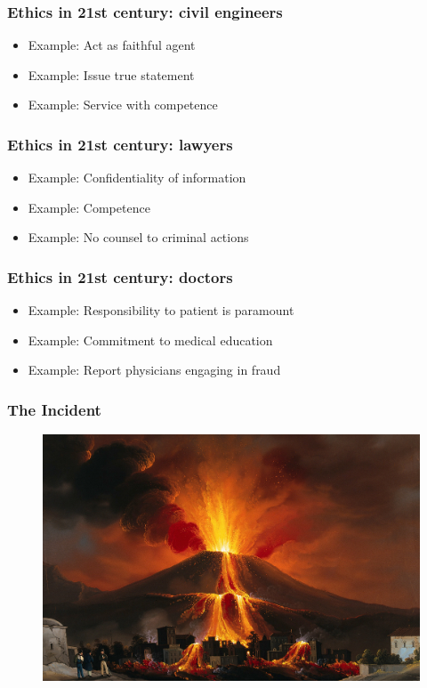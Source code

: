 \begin{frame}[fragile]
\frametitle{Ethics in 21st century: civil engineers}

\begin{itemize}
\item Example: Act as faithful agent\pause
\item Example: Issue true statement\pause
\item Example: Service with competence
\end{itemize}

\end{frame}

\begin{frame}[fragile]
\frametitle{Ethics in 21st century: lawyers}

\begin{itemize}
\item Example: Confidentiality of information\pause
\item Example: Competence\pause
\item Example: No counsel to criminal actions
\end{itemize}

\end{frame}

\begin{frame}[fragile]
\frametitle{Ethics in 21st century: doctors}

\begin{itemize}
\item Example: Responsibility to patient is paramount\pause
\item Example: Commitment to medical education\pause
\item Example: Report physicians engaging in fraud
\end{itemize}

\end{frame}

\begin{frame}[fragile]
\frametitle{The Incident}

\begin{figure}
\includegraphics[scale=0.1]{volcano}
\end{figure}

\end{frame}

